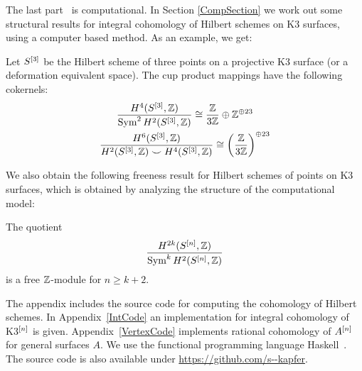 The last part~\cite{Kapfer2} is computational. In Section \ref{CompSection} we work out some structural results for integral cohomology of Hilbert schemes on K3 surfaces, using a computer based method. As an example, we get:
{
\renewcommand{\thetheorem}{\!\!s \ref{p22} and \ref{p24}}
\begin{proposition}
Let $S^{[3]}$ be the Hilbert scheme of three points on a projective K3 surface (or a deformation equivalent space).
The cup product mappings have the following cokernels:
\begin{gather*}
\frac{H^4(S^{[3]},\mathbb{Z})}{\operatorname{Sym}^2 H^2(S^{[3]},\mathbb{Z})}  \cong \frac{\mathbb{Z}}{3\mathbb{Z}} \oplus \mathbb{Z}^ {\oplus 23}\\
\frac{H^6(S^{[3]},\mathbb{Z})}{H^2(S^{[3]},\mathbb{Z})\smile H^4(S^{[3]},\mathbb{Z})} \cong \left(\frac{\mathbb{Z}}{3\mathbb{Z}}\right)^{\oplus 23}
\end{gather*}
\end{proposition}
\addtocounter{theorem}{-1}
}
We also obtain the following freeness result for Hilbert schemes of points on K3 surfaces, which is obtained by analyzing the structure of the computational model:
{
\renewcommand{\thetheorem}{\ref{freeness}}
\begin{theorem}
The quotient
$$
 \frac{H^{2k}(S^{[n]},\mathbb{Z})}{\operatorname{Sym}^k H^{2}(S^{[n]},\mathbb{Z})}
$$
is a free $\mathbb{Z}$-module for $n\geq k+2$.
\end{theorem}
\addtocounter{theorem}{-1}
}
The appendix includes the source code for computing the cohomology of Hilbert schemes. In Appendix~\ref{IntCode} an implementation for integral cohomology of K3$^{[n]}$ is given. 
Appendix~\ref{VertexCode} implements rational cohomology of $A^{[n]}$ for general surfaces $A$. 
We use the functional programming language Haskell~\cite{haskell98}. 
The source code is also available under \url{https://github.com/s--kapfer}.
\vspace{5pt}



